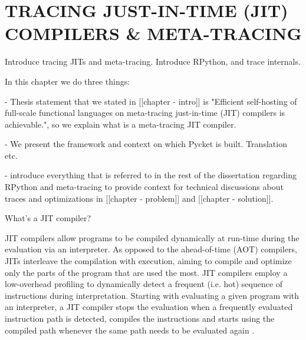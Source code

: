 \chapter[\texorpdfstring{TRACING JUST-IN-TIME (JIT) COMPILERS \& META-TRACING}
                          {RPython \& Meta-tracing}]{TRACING JUST-IN-TIME (JIT) COMPILERS \& META-TRACING}
    \label{chapter:rpython}

    \begin{chaptersynopsis}
        Introduce tracing JITs and meta-tracing.
        Introduce RPython, and trace internals.
    \end{chaptersynopsis}

    \begin{paragraph-here}
        In this chapter we do three things:

        - Thesis statement that we stated in [[chapter - intro]] is "Efficient self-hosting of full-scale functional languages on meta-tracing just-in-time (JIT) compilers is achievable.", so we explain what is a meta-tracing JIT compiler.

        - We present the framework and context on which Pycket is built. Translation etc.

        - introduce everything that is referred to in the rest of the dissertation regarding RPython and meta-tracing to provide context for technical discussions about traces and optimizations in [[chapter - problem]] and [[chapter - solution]].
    \end{paragraph-here}

    \begin{paragraph-here}
        What's a JIT compiler?

        JIT compilers allow programs to be compiled dynamically at run-time
        during the evaluation via an interpreter. As opposed to the
        ahead-of-time (AOT) compilers, JITs interleave the compilation with
        execution, aiming to compile and optimize only the parts of the
        program that are used the most. JIT compilers employ a low-overhead
        profiling to dynamically detect a frequent (i.e. hot) sequence of
        instructions during interpretation. Starting with evaluating a given
        program with an interpreter, a JIT compiler stops the evaluation when
        a frequently evaluated instruction path is detected, compiles the
        instructions and starts using the compiled path whenever the same path
        needs to be evaluated again \cite{dynamo}.
    \end{paragraph-here}

